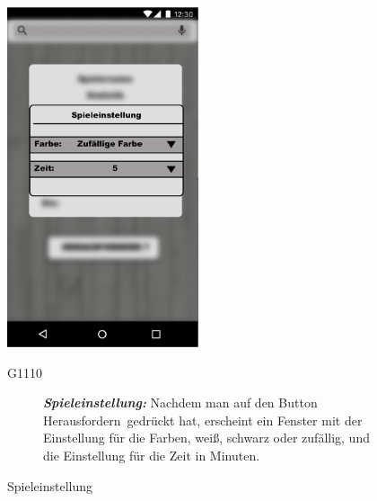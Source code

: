 \documentclass[parskip=full]{scrartcl}
\begin{document}
\begin{figure}[htp]
	\begin{minipage}[t]{6cm}
		\vspace{0pt}
		\includegraphics[height=100mm]{custom_match.png}
		\caption{Spieleinstellung}
		\label{fig:Spieleinstellung}
	\end{minipage}
	\hfill
	\begin{minipage}[t]{6cm}
		\vspace{0pt}
		\begin{description}
			\item[G1110]\textbf{\textit{Spieleinstellung: }} Nachdem man auf den Button \glqq Herausfordern\grqq\ gedrückt hat, erscheint ein Fenster mit der Einstellung für die Farben, weiß, schwarz oder zufällig, und die Einstellung für die Zeit in Minuten.
		\end{description}
	\end{minipage}
\end{figure}
\end{document}
